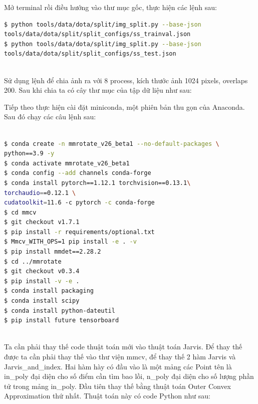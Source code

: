 \documentclass[12pt,a4paper,openany,oneside]{report}
\begin{document}
Mở terminal rồi điều hướng vào thư mục gốc, thực hiện các lệnh sau:

\begin{lstlisting}[language=bash, caption={Câu lệnh để split ảnh trong tập dữ liệu DOTA},
basicstyle=\fontsize{11}{13}\selectfont,
keywordstyle=\bfseries,
label={lst:command-line}]
$ python tools/data/dota/split/img_split.py --base-json
tools/data/dota/split/split_configs/ss_trainval.json
$ python tools/data/dota/split/img_split.py --base-json
tools/data/dota/split/split_configs/ss_test.json
	
\end{lstlisting}


 Sử dụng lệnh để chia ảnh ra với 8 process, kích thước ảnh 1024 pixels, overlaps 200. Sau khi chia ta có cây thư mục của tập dữ liệu như sau:\\




Tiếp theo thực hiện cài đặt miniconda, một phiên bản thu gọn của Anaconda. Sau đó chạy các câu lệnh sau:

\begin{lstlisting}[language=bash, caption={Câu lệnh để split ảnh trong tập dữ liệu DOTA},
	basicstyle=\fontsize{11}{13}\selectfont,
	keywordstyle=\bfseries,
	label={lst:command-line}]

$ conda create -n mmrotate_v26_beta1 --no-default-packages \
python==3.9 -y 
$ conda activate mmrotate_v26_beta1 
$ conda config --add channels conda-forge 
$ conda install pytorch==1.12.1 torchvision==0.13.1\ 
torchaudio==0.12.1 \
cudatoolkit=11.6 -c pytorch -c conda-forge 
$ cd mmcv
$ git checkout v1.7.1
$ pip install -r requirements/optional.txt 
$ Mmcv_WITH_OPS=1 pip install -e . -v 
$ pip install mmdet==2.28.2 
$ cd ../mmrotate 
$ git checkout v0.3.4
$ pip install -v -e . 
$ conda install packaging 
$ conda install scipy 
$ conda install python-dateutil
$ pip install future tensorboard
	
\end{lstlisting}


Ta cần phải thay thế code thuật toán mới vào thuật toán Jarvis. Để thay thế được ta cần phải thay thế vào thư viện mmcv, để thay thế 2 hàm Jarvis và Jarvis\_and\_index. Hai hàm hày có đầu vào là một mảng các Point tên là in\_poly đại diện cho số điểm cần tìm bao lồi, n\_poly đại diện cho số lượng phần tử trong mảng in\_poly. Đầu tiên thay thế bằng thuật toán Outer Convex Approximation thứ nhất. Thuật toán này có code Python như sau:
\end{document}

